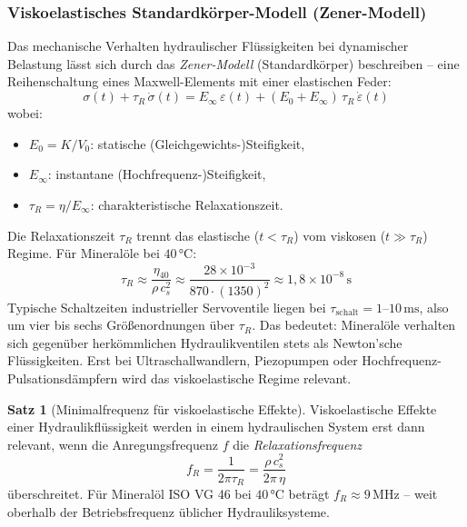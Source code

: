 ﻿\documentclass[a4paper,12pt]{scrreprt}
\theoremstyle{definition}
\newtheorem{satz}{Satz}[section]
\begin{document}
\subsubsection{Viskoelastisches Standardkörper-Modell (Zener-Modell)}

Das mechanische Verhalten hydraulischer Flüssigkeiten bei dynamischer Belastung
lässt sich durch das \emph{Zener-Modell} (Standardkörper) beschreiben --
eine Reihenschaltung eines Maxwell-Elements mit einer elastischen Feder:
\begin{equation}
  \sigma(t) + \tau_R \, \dot{\sigma}(t)
    = E_\infty \, \varepsilon(t) + (E_0 + E_\infty) \, \tau_R \, \dot{\varepsilon}(t)
  \label{eq:zener_modell}
\end{equation}
wobei:
\begin{itemize}
  \item $E_0 = K / V_0$: statische (Gleichgewichts-)Steifigkeit,
  \item $E_\infty$: instantane (Hochfrequenz-)Steifigkeit,
  \item $\tau_R = \eta / E_\infty$: charakteristische Relaxationszeit.
\end{itemize}

Die Relaxationszeit $\tau_R$ trennt das elastische ($t < \tau_R$) vom
viskosen ($t \gg \tau_R$) Regime. Für Mineralöle bei $40\, °\mathrm{C}$:
\begin{equation}
  \tau_R \approx \frac{\eta_{40}}{\rho \, c_s^2}
    \approx \frac{28 \times 10^{-3}}{870 \cdot (1350)^2}
    \approx 1{,}8 \times 10^{-8}\,\mathrm{s}
  \label{eq:tau_mineraloel}
\end{equation}
Typische Schaltzeiten industrieller Servoventile liegen bei
$\tau_{\mathrm{schalt}} = 1$--$10\,\mathrm{ms}$, also um vier bis sechs
Größenordnungen über $\tau_R$. Das bedeutet: Mineralöle verhalten sich
gegenüber herkömmlichen Hydraulikventilen stets als Newton'sche Flüssigkeiten.
Erst bei Ultraschallwandlern, Piezopumpen oder Hochfrequenz-Pulsationsdämpfern
wird das viskoelastische Regime relevant.

\begin{satz}[Minimalfrequenz für viskoelastische Effekte]
  Viskoelastische Effekte einer Hydraulikflüssigkeit werden in einem
  hydraulischen System erst dann relevant, wenn die Anregungsfrequenz
  $f$ die \emph{Relaxationsfrequenz}
  \begin{equation}
    f_R = \frac{1}{2\pi \tau_R} = \frac{\rho \, c_s^2}{2\pi \, \eta}
    \label{eq:relaxationsfrequenz}
  \end{equation}
  überschreitet. Für Mineralöl ISO VG 46 bei $40\, °\mathrm{C}$ beträgt
  $f_R \approx 9\,\mathrm{MHz}$ -- weit oberhalb der Betriebsfrequenz
  üblicher Hydrauliksysteme.
\end{satz}
\end{document}
